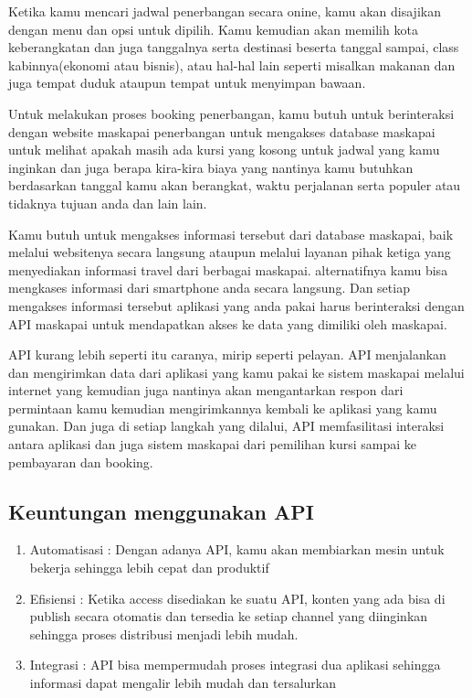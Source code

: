 Ketika kamu mencari jadwal penerbangan secara onine, kamu akan disajikan dengan menu dan opsi untuk dipilih. Kamu kemudian akan memilih kota keberangkatan dan juga tanggalnya serta destinasi beserta tanggal sampai, class kabinnya(ekonomi atau bisnis), atau hal-hal lain seperti misalkan makanan dan juga tempat duduk ataupun tempat untuk menyimpan bawaan.

Untuk melakukan proses booking penerbangan, kamu butuh untuk berinteraksi dengan website maskapai penerbangan untuk mengakses database maskapai untuk melihat apakah masih ada kursi yang kosong untuk jadwal yang kamu inginkan dan juga berapa kira-kira biaya yang nantinya kamu butuhkan berdasarkan tanggal kamu akan berangkat, waktu perjalanan serta populer atau tidaknya tujuan anda dan lain lain.

Kamu butuh untuk mengakses informasi tersebut dari database maskapai, baik melalui websitenya secara langsung ataupun melalui layanan pihak ketiga yang menyediakan informasi travel dari berbagai maskapai. alternatifnya kamu bisa mengkases informasi dari smartphone anda secara langsung. Dan setiap mengakses informasi tersebut aplikasi yang anda pakai harus berinteraksi dengan API maskapai untuk mendapatkan akses ke data yang dimiliki oleh maskapai.

API kurang lebih seperti itu caranya, mirip seperti pelayan. API menjalankan dan mengirimkan data dari aplikasi yang kamu pakai ke sistem maskapai melalui internet yang kemudian juga nantinya akan mengantarkan respon dari permintaan kamu kemudian mengirimkannya kembali ke aplikasi yang kamu gunakan. Dan juga di setiap langkah yang dilalui, API memfasilitasi interaksi antara aplikasi dan juga sistem maskapai dari pemilihan kursi sampai ke pembayaran dan booking.

\subsection{Keuntungan menggunakan API}
\begin{enumerate}
	\item Automatisasi : Dengan adanya API, kamu akan membiarkan mesin untuk bekerja sehingga lebih cepat dan produktif
	\item Efisiensi : Ketika access disediakan ke suatu API, konten yang ada bisa di publish secara otomatis dan tersedia ke setiap channel yang diinginkan sehingga proses distribusi menjadi lebih mudah.
	\item Integrasi : API bisa mempermudah proses integrasi dua aplikasi sehingga informasi dapat mengalir lebih mudah dan tersalurkan
\end{enumerate}
